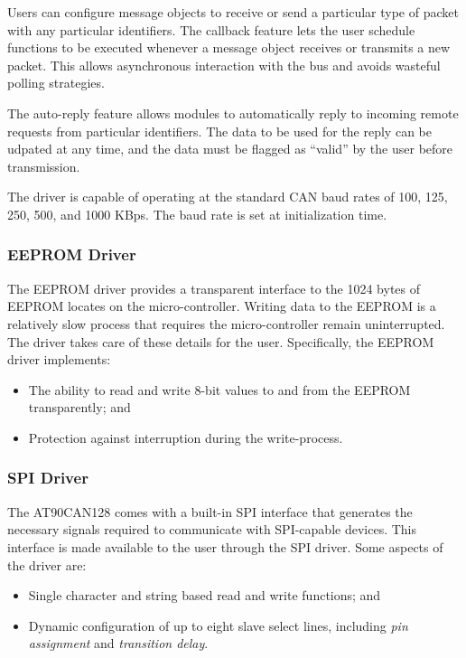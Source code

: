 Users can configure message objects to receive or send a particular type of packet with any particular identifiers. The callback feature lets the user schedule functions to be executed whenever a message object receives or transmits a new packet. This allows asynchronous interaction with the bus and avoids wasteful polling strategies.

The auto-reply feature allows modules to automatically reply to incoming remote requests from particular identifiers. The data to be used for the reply can be udpated at any time, and the data must be flagged as ``valid'' by the user before transmission.

The driver is capable of operating at the standard CAN baud rates of 100, 125, 250, 500, and 1000 KBps. The baud rate is set at initialization time.

\subsubsection{EEPROM Driver}

The EEPROM driver provides a transparent interface to the 1024 bytes of EEPROM locates on the micro-controller. Writing data to the EEPROM is a relatively slow process that requires the micro-controller remain uninterrupted. The driver takes care of these details for the user. Specifically, the EEPROM driver implements:

\begin{itemize}
\item The ability to read and write 8-bit values to and from the EEPROM transparently; and
\item Protection against interruption during the write-process.
\end{itemize}

\subsubsection{SPI Driver}

The AT90CAN128 comes with a built-in SPI interface that generates the necessary signals required to communicate with SPI-capable devices. This interface is made available to the user through the SPI driver. Some aspects of the driver are:

\begin{itemize}
\item Single character and string based read and write functions; and
\item Dynamic configuration of up to eight slave select lines, including \emph{pin assignment} and \emph{transition delay}.
\end{itemize}

